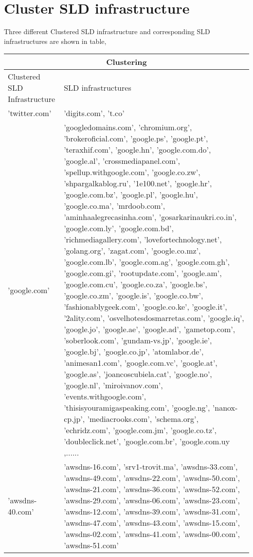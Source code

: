 \section{Cluster SLD infrastructure} 
Three different Clustered SLD infrastructure and corresponding SLD infrastructures are shown in table,

\begin{tabular}{ |p{3cm}||p{9cm}| }
 \hline
 \multicolumn{2}{|c|}{Clustering} \\
 \hline
 Clustered SLD Infrastructure     & SLD infrastructures\\
 \hline
 'twitter.com' & 'digits.com', 't.co'\\
'google.com'& 'googledomains.com', 'chromium.org', 'brokeroficial.com', 'google.ps', 'google.pt', 'teraxhif.com', 'google.hn', 'google.com.do', 'google.al', 'crossmediapanel.com', 'spellup.withgoogle.com', 'google.co.zw', 'shpargalkablog.ru', '1e100.net', 'google.hr', 'google.com.bz', 'google.pl', 'google.hu', 'google.co.ma', 'mrdoob.com', 'aminhaalegrecasinha.com', 'gosarkarinaukri.co.in', 'google.com.ly', 'google.com.bd', 'richmediagallery.com', 'lovefortechnology.net', 'golang.org', 'zagat.com', 'google.co.mz', 'google.com.lb', 'google.com.ag', 'google.com.gh', 'google.com.gi', 'rootupdate.com', 'google.am', 'google.com.cu', 'google.co.za', 'google.bs', 'google.co.zm', 'google.is', 'google.co.bw', 'fashionablygeek.com', 'google.co.ke', 'google.it', '2ality.com', 'osvelhotesdosmarretas.com', 'google.iq', 'google.jo', 'google.ae', 'google.ad', 'gametop.com', 'soberlook.com', 'gundam-vs.jp', 'google.ie', 'google.bj', 'google.co.jp', 'atomlabor.de', 'animesan1.com', 'google.com.vc', 'google.at', 'google.as', 'joancoscubiela.cat', 'google.no', 'google.nl', 'miroivanov.com', 'events.withgoogle.com', 'thisisyouramigaspeaking.com', 'google.ng', 'nanox-cp.jp', 'mediacrooks.com', 'schema.org', 'echridz.com', 'google.com.jm', 'google.co.tz', 'doubleclick.net', 'google.com.br', 'google.com.uy ,......\\
 'awsdns-40.com' &  'awsdns-16.com', 'srv1-trovit.ma', 'awsdns-33.com', 'awsdns-49.com', 'awsdns-22.com', 'awsdns-50.com', 'awsdns-21.com', 'awsdns-36.com', 'awsdns-52.com', 'awsdns-29.com', 'awsdns-06.com', 'awsdns-23.com', 'awsdns-12.com', 'awsdns-39.com', 'awsdns-31.com', 'awsdns-47.com', 'awsdns-43.com', 'awsdns-15.com', 'awsdns-02.com', 'awsdns-41.com', 'awsdns-00.com', 'awsdns-51.com'\\
\hline
\end{tabular}
\newline
